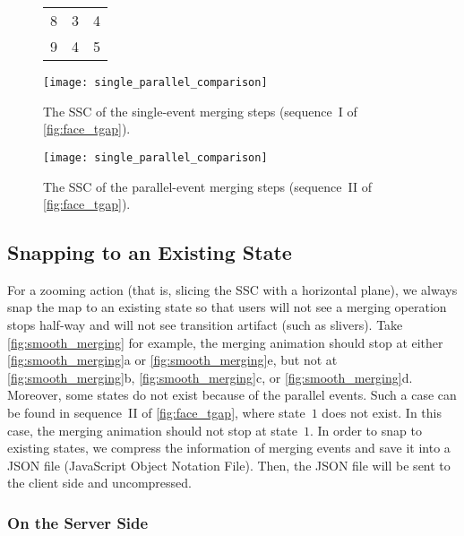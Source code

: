 \documentclass[ijgi,article,submit,moreauthors,pdftex]{Definitions/mdpi}
\begin{document}
\begin{figure}[tb]
{\begin{tabular}{ccc}
8       &     3         &     4          \\ 
9       &     4         &     5          \\ \hline
\end{tabular}
}
\vspace{8mm} %
%
\captionsetup*{type=figure} %
\parbox{.49\linewidth}{
\centering
\texttt{[image: single\_parallel\_comparison]}
\vspace{3mm} %
\caption{The SSC of the single-event merging steps
    (sequence~I of \fig\ref{fig:face_tgap}).}
\label{fig:ssc_single}
}
\parbox{.49\linewidth}{
\centering
\texttt{[image: single\_parallel\_comparison]}
\vspace{3mm} %
\caption{The SSC of the parallel-event merging steps
    (sequence~II of \fig\ref{fig:face_tgap}).}
\label{fig:ssc_parallel}
}
\end{figure}




\subsection{Snapping to an Existing State}
\label{sec:snap}

For a zooming action
(that is, slicing the SSC with a horizontal plane), 
we always snap the map to an existing state
so that users will not see a merging operation stops half-way
and will not see transition artifact (such as slivers).
Take \fig\ref{fig:smooth_merging} for example, 
the merging animation should stop at 
either \ref{fig:smooth_merging}a or \ref{fig:smooth_merging}e,
but not at \ref{fig:smooth_merging}b, \ref{fig:smooth_merging}c, 
or \ref{fig:smooth_merging}d.
Moreover, some states do not exist because of the parallel events.
Such a case can be found in sequence~II of \fig\ref{fig:face_tgap},
where state~$1$ does not exist.
In this case, the merging animation should not stop at state~$1$.
In order to snap to existing states, 
we compress the information of merging events and save it into 
a JSON file (JavaScript Object Notation File).
Then, the JSON file will be sent to the client side and uncompressed.


\subsubsection{On the Server Side}
\label{sec:snap_server}
\end{document}

